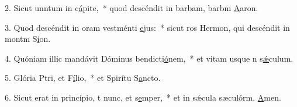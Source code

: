 2. Sicut unntum in c\uline{á}pite,~* quod descéndit in barbam, barbm \uline{A}aron.\par 
3. Quod descéndit in oram vestménti \uline{e}jus:~* sicut ros Hermon, qui descéndit in montm S\uline{i}on.\par 
4. Quóniam illic mandávit Dóminus bendicti\uline{ó}nem,~* et vitam usque n s\uline{ǽ}culum.\par 
5. Glória Ptri, et F\uline{í}lio,~* et Spirítu S\uline{a}ncto.\par 
6. Sicut erat in princípio, t nunc, et s\uline{e}mper,~* et in sǽcula sæculórm. \uline{A}men.\par 
